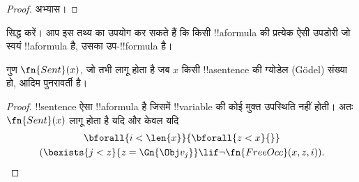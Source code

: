 \documentclass[../../../include/open-logic-section]{subfiles}
\begin{document}
\begin{proof}
अभ्यास।
\end{proof}

\begin{prob}
 सिद्ध करें। आप इस तथ्य का उपयोग
कर सकते हैं कि किसी !!a{formula} की प्रत्येक ऐसी उपडोरी जो स्वयं !!a{formula}
है, उसका उप-!!{formula} है।
\end{prob}

\begin{prop}
गुण $\fn{Sent}(x)$, जो तभी लागू होता है जब $x$ किसी !!a{sentence} की ग्योडेल (G\"odel)
 संख्या हो, आदिम पुनरावर्ती है।
\end{prop}

\begin{proof}
!!{sentence} ऐसा !!a{formula} है जिसमें !!{variable} की कोई मुक्त उपस्थिति
नहीं होती। अतः $\fn{Sent}(x)$ लागू होता है यदि और केवल यदि
\begin{multline*}
\bforall{i<\len{x}}{\bforall{z<x}{}}\\
(\bexists{j<z}{z=\Gn{\Obj v_j}} \lif \lnot\fn{FreeOcc}(x,z,i)).
\end{multline*}
\end{proof}
\end{document}
